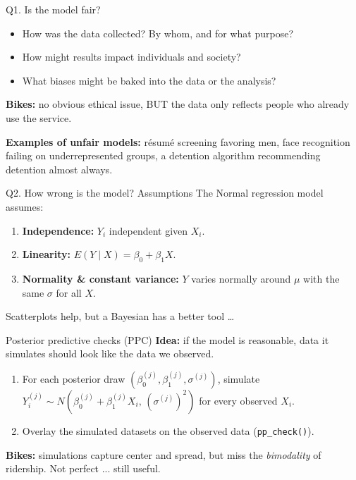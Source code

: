 \documentclass[aspectratio=43,11pt]{beamer}
\begin{document}
\begin{frame}{Q1. Is the model fair?}
  \begin{itemize}
    \item How was the data collected? By whom, and for what purpose?
    \item How might results impact individuals and society?
    \item What biases might be baked into the data or the analysis?
  \end{itemize}
  \vspace{0.5em}
  \textbf{Bikes:} no obvious ethical issue, BUT the data only reflects
  people who already use the service.
  \vspace{0.5em}

  \textbf{Examples of unfair models:} résumé screening favoring men,
  face recognition failing on underrepresented groups, a detention
  algorithm recommending detention almost always.
\end{frame}

\begin{frame}{Q2. How wrong is the model? Assumptions}
  The Normal regression model assumes:
  \begin{enumerate}
    \item \textbf{Independence:} $Y_i$ independent given $X_i$.
    \item \textbf{Linearity:} $E(Y\mid X) = \beta_0 + \beta_1 X$.
    \item \textbf{Normality \& constant variance:} $Y$ varies normally
      around $\mu$ with the same $\sigma$ for all $X$.
  \end{enumerate}
  \vspace{0.5em}
  Scatterplots help, but a Bayesian has a better tool \ldots
\end{frame}

\begin{frame}{Posterior predictive checks (PPC)}
  \textbf{Idea:} if the model is reasonable, data it simulates should look
  like the data we observed.
  \vspace{0.5em}
  \begin{enumerate}
    \item For each posterior draw $(\beta_0^{(j)},\beta_1^{(j)},\sigma^{(j)})$,
      simulate $Y_i^{(j)} \sim N(\beta_0^{(j)}+\beta_1^{(j)}X_i,\,(\sigma^{(j)})^2)$
      for every observed $X_i$.
    \item Overlay the simulated datasets on the observed data
      (\texttt{pp\_check()}).
  \end{enumerate}
  \vspace{0.5em}
  \textbf{Bikes:} simulations capture center and spread, but miss the
  \emph{bimodality} of ridership. Not perfect ... still useful.
\end{frame}
\end{document}

